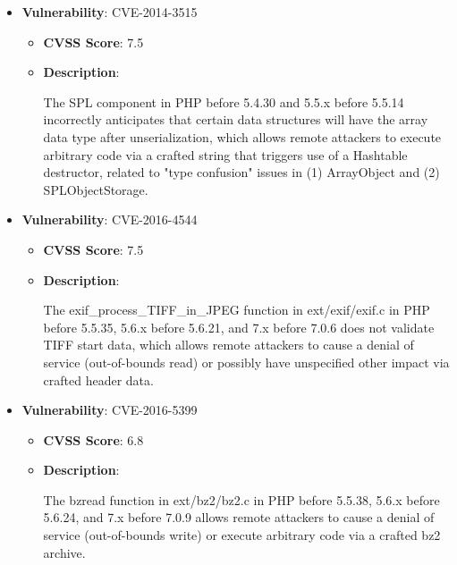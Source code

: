 \documentclass{article}
\begin{document}
\begin{itemize}
        \item \textbf{Vulnerability}: CVE-2014-3515
        \begin{itemize}
            \item \textbf{CVSS Score}:  7.5 
            \item \textbf{Description}:
            \parbox[t]{0.9\linewidth}{
                \ttfamily The SPL component in PHP before 5.4.30 and 5.5.x before 5.5.14 incorrectly anticipates that certain data structures will have the array data type after unserialization, which allows remote attackers to execute arbitrary code via a crafted string that triggers use of a Hashtable destructor, related to "type confusion" issues in (1) ArrayObject and (2) SPLObjectStorage.
            }
        \end{itemize}
    
        \item \textbf{Vulnerability}: CVE-2016-4544
        \begin{itemize}
            \item \textbf{CVSS Score}:  7.5 
            \item \textbf{Description}:
            \parbox[t]{0.9\linewidth}{
                \ttfamily The exif\_process\_TIFF\_in\_JPEG function in ext/exif/exif.c in PHP before 5.5.35, 5.6.x before 5.6.21, and 7.x before 7.0.6 does not validate TIFF start data, which allows remote attackers to cause a denial of service (out-of-bounds read) or possibly have unspecified other impact via crafted header data.
            }
        \end{itemize}
    
        \item \textbf{Vulnerability}: CVE-2016-5399
        \begin{itemize}
            \item \textbf{CVSS Score}:  6.8 
            \item \textbf{Description}:
            \parbox[t]{0.9\linewidth}{
                \ttfamily The bzread function in ext/bz2/bz2.c in PHP before 5.5.38, 5.6.x before 5.6.24, and 7.x before 7.0.9 allows remote attackers to cause a denial of service (out-of-bounds write) or execute arbitrary code via a crafted bz2 archive.
            }
        \end{itemize}
    

\end{itemize}
\end{document}
